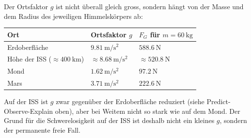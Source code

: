 \documentclass[addpoints,11pt,a4paper]{exam}
\begin{document}
\begin{theoriebox}
Der Ortsfaktor $g$ ist nicht überall gleich gross, sondern hängt von der
Masse und dem Radius des jeweiligen Himmelskörpers ab:

\begin{center}
\begin{tabular}{@{}lll@{}}
\toprule
\textbf{Ort} & \textbf{Ortsfaktor $g$} & \textbf{$F_G$ für $m=\SI{60}{\kilo\gram}$} \\
\midrule
Erdoberfläche & $\SI{9.81}{\meter\per\second\squared}$ & $\SI{588.6}{\newton}$ \\
Höhe der ISS ($\approx\SI{400}{\kilo\meter}$) & $\approx\SI{8.68}{\meter\per\second\squared}$ & $\approx\SI{520.8}{\newton}$ \\
Mond & $\SI{1.62}{\meter\per\second\squared}$ & $\SI{97.2}{\newton}$ \\
Mars & $\SI{3.71}{\meter\per\second\squared}$ & $\SI{222.6}{\newton}$ \\
\bottomrule
\end{tabular}
\end{center}

Auf der ISS ist $g$ zwar gegenüber der Erdoberfläche reduziert (siehe
Predict-Observe-Explain oben), aber bei Weitem nicht so stark wie auf dem
Mond. Der Grund für die Schwerelosigkeit auf der ISS ist deshalb nicht ein
kleines $g$, sondern der permanente freie Fall.
\end{theoriebox}
\end{document}
